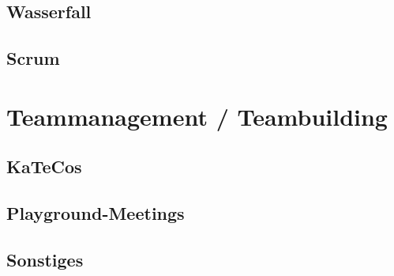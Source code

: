   \subsection{Wasserfall}

  \subsection{Scrum}

\section{Teammanagement / Teambuilding}

  \subsection{KaTeCos}

  \subsection{Playground-Meetings}

  \subsection{Sonstiges}
